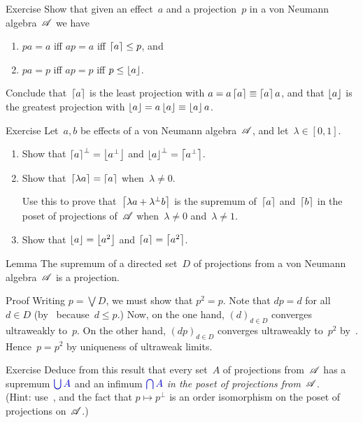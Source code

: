 \documentclass[a]{subfiles}
\begin{document}
\begin{parsec}
\begin{point}{Exercise}%
Show that given an effect~$a$ and a projection~$p$
in a von Neumann algebra~$\mathscr{A}$ we have
\begin{enumerate}
\item
$pa=a$ iff $ap=a$ iff $\left\lceil a\right\rceil\leq p$, and
\item
$pa=p$ iff $ap=p$ iff $p\leq \left\lfloor a\right\rfloor$.
\end{enumerate}
Conclude that~$\left\lceil a\right\rceil$
is the least projection with $a=a\left\lceil a\right\rceil\equiv\left\lceil a\right\rceil a$,
and that $\left\lfloor a\right\rfloor$
is the greatest projection with $\left\lfloor a\right\rfloor=a\left\lfloor a\right\rfloor\equiv \left\lfloor a\right\rfloor a$.
\end{point}
\begin{point}{Exercise}%
Let~$a,b$ be effects of a von Neumann algebra~$\mathscr{A}$,
and let~$\lambda\in [0,1]$.
\begin{enumerate}
\item
Show that $\left\lceil a\right\rceil^\perp = \left\lfloor a^\perp\right\rfloor$
and $\left\lfloor a\right\rfloor^\perp = \left\lceil a^\perp\right\rceil$.
\item
Show that~$\left\lceil\lambda a\right\rceil = \left\lceil a\right\rceil$
when~$\lambda\neq 0$.

Use this to prove that~$\left\lceil\lambda a+\lambda^\perp b\right\rceil$
is the supremum of~$\left\lceil a\right\rceil$ and~$\left\lceil b\right\rceil$
in the poset of projections of~$\mathscr{A}$
when~$\lambda\neq 0$ and~$\lambda\neq 1$.
\item
Show that $\left\lfloor a\right\rfloor=\left\lfloor a^2\right\rfloor$
and $\left\lceil a\right\rceil=\left\lceil a^2\right\rceil$.
\end{enumerate}
\end{point}
\begin{point}{Lemma}%
The supremum of a directed set~$D$ of projections
from a von Neumann algebra~$\mathscr{A}$ is a projection.
\begin{point}{Proof}%
Writing $p=\bigvee D$,
we must show that $p^2=p$.
Note that $dp=d$ for all~$d\in D$
(by~ because~$d\leq p$.)
Now, on the one hand, $(d)_{d\in D}$
converges ultraweakly to~$p$.
On the other hand,
$(dp)_{d\in D}$
converges ultraweakly to~$p^2$ by~.
Hence~$p=p^2$ by uniqueness of ultraweak limits.
\end{point}
\end{point}
\begin{point}{Exercise}%
Deduce from this result
 that every set~$A$ of projections from~$\mathscr{A}$
has a supremum $\Define{\bigcup A}$
and an infimum $\Define{\bigcap A}$
\emph{in the poset of projections from~$\mathscr{A}$}.\\
(Hint: use~,
and the fact that $p\mapsto p^\perp$ 
is an order isomorphism on the poset of projections on~$\mathscr{A}$.)
\end{point}
\end{parsec}
\end{document}
